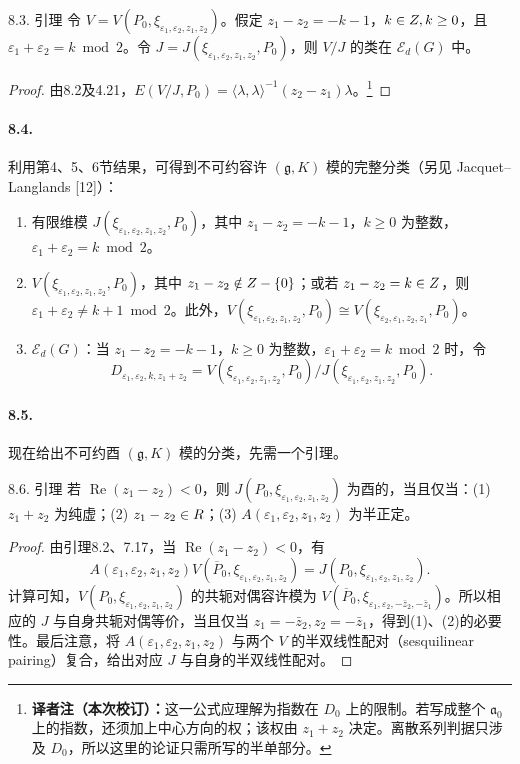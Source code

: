 \begin{originaltheorem}{8.3. 引理}
令 $V=V(P_0,\xi_{\varepsilon_1,\varepsilon_2,z_1,z_2})$。假定 $z_1-z_2=-k-1$，$k\in Z,k\ge0$，且 $\varepsilon_1+\varepsilon_2=k\bmod2$。令 $J=J(\xi_{\varepsilon_1,\varepsilon_2,z_1,z_2},P_0)$，则 $V/J$ 的类在 $\mathcal E_d(G)$ 中。
\end{originaltheorem}
\begin{proof}
由8.2及4.21，$E(V/J,P_0)=\langle\lambda,\lambda\rangle^{-1}(z_2-z_1)\lambda$。\footnote{\textbf{译者注（本次校订）：}这一公式应理解为指数在 $D_0$ 上的限制。若写成整个 $\mathfrak a_0$ 上的指数，还须加上中心方向的权；该权由 $z_1+z_2$ 决定。离散系列判据只涉及 $D_0$，所以这里的论证只需所写的半单部分。}
\end{proof}
\paragraph*{8.4.} 利用第4、5、6节结果，可得到不可约容许 $(\mathfrak g,K)$ 模的完整分类（另见 Jacquet--Langlands [12]）：
\begin{enumerate}
\item[(I)] 有限维模 $J(\xi_{\varepsilon_1,\varepsilon_2,z_1,z_2},P_0)$，其中 $z_1-z_2=-k-1$，$k\ge0$ 为整数，$\varepsilon_1+\varepsilon_2=k\bmod2$。
\item[(II)] $V(\xi_{\varepsilon_1,\varepsilon_2,z_1,z_2},P_0)$，其中 $z_1-z_2\notin Z-\{0\}$；或若 $z_1-z_2=k\in Z$，则 $\varepsilon_1+\varepsilon_2\ne k+1\bmod2$。此外，$V(\xi_{\varepsilon_1,\varepsilon_2,z_1,z_2},P_0)\cong V(\xi_{\varepsilon_2,\varepsilon_1,z_2,z_1},P_0)$。
\item[(III)] $\mathcal E_d(G)$：当 $z_1-z_2=-k-1$，$k\ge0$ 为整数，$\varepsilon_1+\varepsilon_2=k\bmod2$ 时，令
\[
 D_{\varepsilon_1,\varepsilon_2,k,z_1+z_2}
 =V(\xi_{\varepsilon_1,\varepsilon_2,z_1,z_2},P_0)/J(\xi_{\varepsilon_1,\varepsilon_2,z_1,z_2},P_0).
\]
\end{enumerate}
\paragraph*{8.5.} 现在给出不可约酉 $(\mathfrak g,K)$ 模的分类，先需一个引理。
\begin{originaltheorem}{8.6. 引理}
若 $\operatorname{Re}(z_1-z_2)<0$，则 $J(P_0,\xi_{\varepsilon_1,\varepsilon_2,z_1,z_2})$ 为酉的，当且仅当：(1) $z_1+z_2$ 为纯虚；(2) $z_1-z_2\in R$；(3) $A(\varepsilon_1,\varepsilon_2,z_1,z_2)$ 为半正定。
\end{originaltheorem}
\begin{proof}
由引理8.2、7.17，当 $\operatorname{Re}(z_1-z_2)<0$，有
\[
 A(\varepsilon_1,\varepsilon_2,z_1,z_2)V(\overline P_0,\xi_{\varepsilon_1,\varepsilon_2,z_1,z_2})
 =J(P_0,\xi_{\varepsilon_1,\varepsilon_2,z_1,z_2}).
\]
计算可知，$V(P_0,\xi_{\varepsilon_1,\varepsilon_2,z_1,z_2})$ 的共轭对偶容许模为 $V(\overline P_0,\xi_{\varepsilon_1,\varepsilon_2,-\bar z_2,-\bar z_1})$。所以相应的 $J$ 与自身共轭对偶等价，当且仅当 $z_1=-\bar z_2,z_2=-\bar z_1$，得到(1)、(2)的必要性。最后注意，将 $A(\varepsilon_1,\varepsilon_2,z_1,z_2)$ 与两个 $V$ 的半双线性配对（sesquilinear pairing）复合，给出对应 $J$ 与自身的半双线性配对。
\end{proof}
